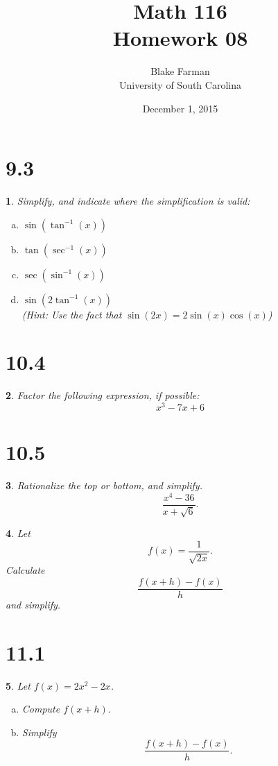 \documentclass[12pt]{amsart}
\author{Blake Farman\\University of South Carolina}
\title{Math 116\\Homework 08}
\date{December 1, 2015}
\theoremstyle{plain}
\newtheorem{thm}{}
\begin{document}
\maketitle

\section*{9.3}
\renewcommand{\exp}[1]{\operatorname{e}^{#1}}

\setcounter{thm}{3}
\begin{thm}
  Simplify, and indicate where the simplification is valid:
  \begin{enumerate}[(a)]
  \item
    $\displaystyle{\sin\left(\tan^{-1}(x)\right)}$
  \item
    $\displaystyle{\tan\left(\sec^{-1}(x)\right)}$
  \item
    $\displaystyle{\sec\left(\sin^{-1}(x)\right)}$
  \item
    $\displaystyle{\sin\left(2\tan^{-1}(x)\right)}$\\
    ({\it Hint}: Use the fact that $\sin(2x) = 2\sin(x)\cos(x)$)
  \end{enumerate}
\end{thm}

\newpage
\section*{10.4}

\setcounter{thm}{1}
\begin{thm}
  Factor the following expression, if possible:
  $$x^3 -7x + 6$$
\end{thm}

\newpage
\section*{10.5}

\setcounter{thm}{5}
\begin{thm}
  Rationalize the top or bottom, and simplify.
  $$\frac{x^4 - 36}{x + \sqrt{6}}.$$
\end{thm}

\setcounter{thm}{7}
\begin{thm}
  Let 
  $$f(x) = \frac{1}{\sqrt{2x}}.$$
  Calculate
  $$\frac{f(x + h) - f(x)}{h}$$
  and simplify.
\end{thm}

\newpage
\section*{11.1}

\setcounter{thm}{1}
\begin{thm}
  Let $f(x) = 2x^2 - 2x$.
  \begin{enumerate}[(a)]
  \item
    Compute $f(x + h)$.
  \item
    Simplify 
    $$\frac{f(x + h) - f(x)}{h}.$$
  \end{enumerate}
\end{thm}
\end{document}

